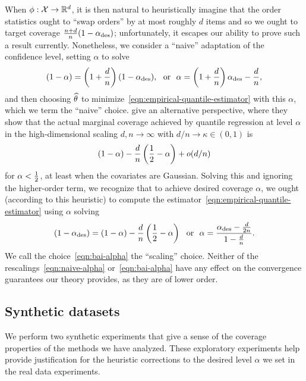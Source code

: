 \documentclass[11pt]{article}
\begin{document}
When $\phi : \mathcal{X} \to \mathbb{R}^d$, it is then natural to heuristically imagine
that the order statistics ought to ``swap orders'' by at most roughly $d$
items and so we ought to target coverage $\frac{n + d}{n}(1 -
\alpha_{\textup{des}})$; unfortunately, it escapes our ability to prove such a
result currently.
%
Nonetheless, we consider a ``naive'' adaptation of the confidence level,
setting $\alpha$ to solve
\begin{equation}
  \label{eqn:naive-alpha}
  (1 - \alpha) = \left(1 + \frac{d}{n}\right) (1 - \alpha_{\textup{des}}),
  ~~ \mbox{or} ~~
  \alpha = \left(1 + \frac{d}{n}\right) \alpha_{\textup{des}} - \frac{d}{n},
\end{equation}
and then choosing $\widehat{\theta}$ to
minimize~\eqref{eqn:empirical-quantile-estimator} with this $\alpha$,
which we term the ``naive'' choice.
%
\citet{BaiMeWaXi21} give an alternative perspective, where they show
that the actual marginal coverage achieved by quantile regression
at level $\alpha$ in the high-dimensional scaling $d, n \to \infty$ with
$d/n \to \kappa \in (0, 1)$ is
\begin{equation*}
  (1 - \alpha) - \frac{d}{n} \left(\frac{1}{2} - \alpha\right) + o(d/n)
\end{equation*}
for $\alpha < \frac{1}{2}$, at least when the covariates are Gaussian.
%
Solving this and ignoring the higher-order term, we recognize that to
achieve desired coverage $\alpha$, we ought (according to this heuristic) to
compute the estimator~\eqref{eqn:empirical-quantile-estimator} using
$\alpha$ solving
\begin{equation}
  \label{eqn:bai-alpha}
  (1 - \alpha_{\textup{des}}) = (1 - \alpha) - \frac{d}{n}
  \left(\frac{1}{2} - \alpha\right)
  ~~ \mbox{or} ~~
  \alpha = \frac{\alpha_{\textup{des}} - \frac{d}{2n}}{1 - \frac{d}{n}}.
\end{equation}
We call the choice~\eqref{eqn:bai-alpha} the ``scaling'' choice.
%
Neither of the rescalings~\eqref{eqn:naive-alpha} or~\eqref{eqn:bai-alpha}
have any effect on the convergence guarantees our theory provides, as they
are of lower order.

\subsection{Synthetic datasets}
\label{sec:synthetic}

We perform two synthetic experiments that give a
sense of the coverage properties of the methods we have analyzed.
%
These exploratory experiments help provide justification for the heuristic
corrections to the desired level $\alpha$ we set in the real data
experiments.
\end{document}
